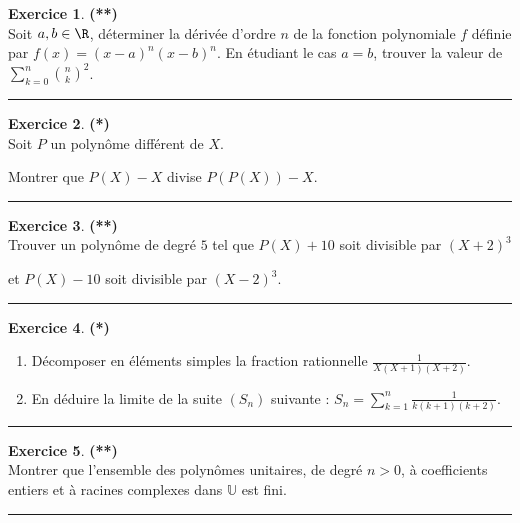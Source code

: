 \documentclass[a4paper,11pt]{article}
\theoremstyle{definition}
\newtheorem{exo}{Exercice} %
\begin{document}
\begin{exo}\textbf{(**)}\quad\\[0.25cm]
	Soit $a,b\in\R$, déterminer la dérivée d'ordre $n$ de la fonction polynomiale $f$ définie par $f(x)=(x-a)^n (x-b)^n$.
	En étudiant le cas $a=b$, trouver la valeur de $\sum_{k=0}^n \binom{n}{k}^2$.
	
	\centering
	\rule{1\linewidth}{0.6pt}
\end{exo}	



\begin{exo}\textbf{(*)}\quad\\[0.25cm]
 Soit $P$ un polynôme différent de $X$.

Montrer que $P(X)-X$ divise $P(P(X))-X$.
	
	\centering
	\rule{1\linewidth}{0.6pt}
\end{exo}

\begin{exo}\textbf{(**)}\quad\\[0.25cm]
	Trouver un polynôme de degré $5$ tel que $P(X)+10$ soit divisible par $(X+2)^3$ 
	
	et $P(X)-10$ soit divisible par $(X-2)^3$.
	
	\centering
	\rule{1\linewidth}{0.6pt}
\end{exo}


\newpage

\begin{exo}\textbf{(*)}\quad\\[0.25cm]
				\begin{enumerate}
		\item Décomposer en éléments simples la fraction rationnelle $\displaystyle\frac{1}{X(X+1)(X+2)}$.
		\item En déduire la limite de la suite $(S_n)$ suivante : $\displaystyle S_n=\sum_{k=1}^n \frac{1}{k(k+1)(k+2)}$.
	\end{enumerate}

	\centering
	\rule{1\linewidth}{0.6pt}
\end{exo}

\begin{exo}\textbf{(**)}\quad\\[0.25cm]
	Montrer que l'ensemble des polynômes unitaires, de degré $n > 0$, à coefficients entiers et à racines complexes dans $\mathbb U$ est fini.
	
	\centering
	\rule{1\linewidth}{0.6pt}
\end{exo}
\end{document}
